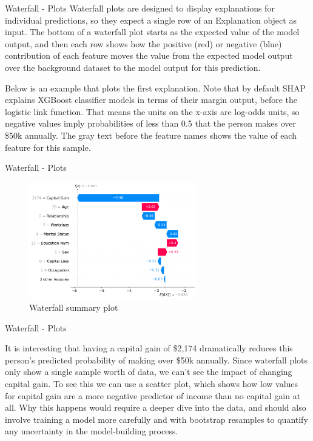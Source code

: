 \documentclass[aspectratio=169]{beamer}
\begin{document}
\begin{frame}{Waterfall - Plots}
    Waterfall plots are designed to display explanations for individual predictions, so they expect a single row of an Explanation object as input. The bottom of a waterfall plot starts as the expected value of the model output, and then each row shows how the positive (red) or negative (blue) contribution of each feature moves the value from the expected model output over the background dataset to the model output for this prediction.
    
    Below is an example that plots the first explanation. Note that by default \ac{SHAP} explains XGBoost classifier models in terms of their margin output, before the logistic link function. That means the units on the x-axis are log-odds units, so negative values imply probabilities of less than 0.5 that the person makes over \$50k annually. The gray text before the feature names shows the value of each feature for this sample.
\end{frame}

\begin{frame}{Waterfall - Plots}
    \begin{figure}[htbp]
        \centering
        \includegraphics[width=0.65\textwidth]{figs/shap/plots/waterfall/example_notebooks_api_examples_plots_waterfall_3_0.png}
        \caption{Waterfall summary plot}
        \label{fig:waterfall-plot}
    \end{figure}
\end{frame}

\begin{frame}{Waterfall - Plots}

    It is interesting that having a capital gain of \$2,174 dramatically reduces this person’s predicted probability of making over \$50k annually. Since waterfall plots only show a single sample worth of data, we can’t see the impact of changing capital gain. To see this we can use a scatter plot, which shows how low values for capital gain are a more negative predictor of income than no capital gain at all. Why this happens would require a deeper dive into the data, and should also involve training a model more carefully and with bootstrap resamples to quantify any uncertainty in the model-building process.
\end{frame}
\end{document}
